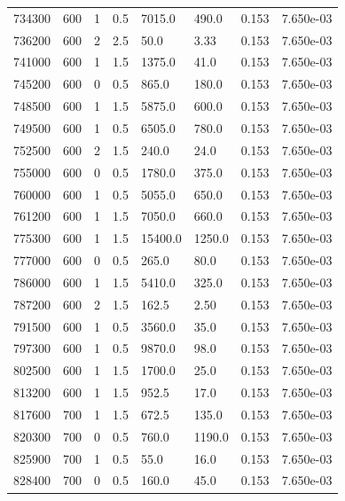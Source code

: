 \documentclass[preview]{standalone}
\begin{document}
{{{{{\begin{tabular}{L{1.2cm}C{1.2cm} C{0.3cm}C{0.5cm} C{1.4cm}C{1.4cm} C{1.4cm}C{1.4cm}}
  734300  &   600  & 1     & 0.5 &  7015.0  & 490.0  & 0.153 &  7.650e-03   \\ 
  736200  &   600  & 2     & 2.5 &  50.0  & 3.33  & 0.153 &  7.650e-03   \\ 
  741000  &   600  & 1     & 1.5 &  1375.0  & 41.0  & 0.153 &  7.650e-03   \\ 
  745200  &   600  & 0     & 0.5 &  865.0  & 180.0  & 0.153 &  7.650e-03   \\ 
  748500  &   600  & 1     & 1.5 &  5875.0  & 600.0  & 0.153 &  7.650e-03   \\ 
  749500  &   600  & 1     & 0.5 &  6505.0  & 780.0  & 0.153 &  7.650e-03   \\ 
  752500  &   600  & 2     & 1.5 &  240.0  & 24.0  & 0.153 &  7.650e-03   \\ 
  755000  &   600  & 0     & 0.5 &  1780.0  & 375.0  & 0.153 &  7.650e-03   \\ 
  760000  &   600  & 1     & 0.5 &  5055.0  & 650.0  & 0.153 &  7.650e-03   \\ 
  761200  &   600  & 1     & 1.5 &  7050.0  & 660.0  & 0.153 &  7.650e-03   \\ 
  775300  &   600  & 1     & 1.5 &  15400.0  & 1250.0  & 0.153 &  7.650e-03   \\ 
  777000  &   600  & 0     & 0.5 &  265.0  & 80.0  & 0.153 &  7.650e-03   \\ 
  786000  &   600  & 1     & 1.5 &  5410.0  & 325.0  & 0.153 &  7.650e-03   \\ 
  787200  &   600  & 2     & 1.5 &  162.5  & 2.50  & 0.153 &  7.650e-03   \\ 
  791500  &   600  & 1     & 0.5 &  3560.0  & 35.0  & 0.153 &  7.650e-03   \\ 
  797300  &   600  & 1     & 0.5 &  9870.0  & 98.0  & 0.153 &  7.650e-03   \\ 
  802500  &   600  & 1     & 1.5 &  1700.0  & 25.0  & 0.153 &  7.650e-03   \\ 
  813200  &   600  & 1     & 1.5 &  952.5  & 17.0  & 0.153 &  7.650e-03   \\ 
  817600  &   700  & 1     & 1.5 &  672.5  & 135.0  & 0.153 &  7.650e-03   \\ 
  820300  &   700  & 0     & 0.5 &  760.0  & 1190.0  & 0.153 &  7.650e-03   \\ 
  825900  &   700  & 1     & 0.5 &  55.0  & 16.0  & 0.153 &  7.650e-03   \\ 
  828400  &   700  & 0     & 0.5 &  160.0  & 45.0  & 0.153 &  7.650e-03   \\ 

\end{tabular}}}}}}
\end{document}

